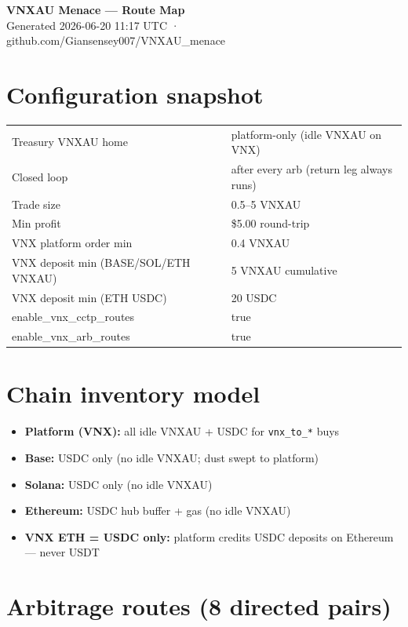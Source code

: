 \documentclass[11pt,a4paper]{article}
\begin{document}
\begin{center}
{\LARGE\bfseries\color{accent} VNXAU Menace --- Route Map}\\[6pt]
{\color{muted}\small Generated 2026-06-20 11:17 UTC · github.com/Giansensey007/VNXAU\_menace}\\[12pt]
\end{center}
\section*{Configuration snapshot}
\begin{tabular}{@{}ll@{}}
Treasury VNXAU home & platform-only (idle VNXAU on VNX) \\
Closed loop & after every arb (return leg always runs) \\
Trade size & 0.5--5 VNXAU \\
Min profit & \$5.00 round-trip \\
VNX platform order min & 0.4 VNXAU \\
VNX deposit min (BASE/SOL/ETH VNXAU) & 5 VNXAU cumulative \\
VNX deposit min (ETH USDC) & 20 USDC \\
enable\_vnx\_cctp\_routes & true \\
enable\_vnx\_arb\_routes & true \\
\end{tabular}
\section*{Chain inventory model}
\begin{itemize}[nosep]
\item \textbf{Platform (VNX):} all idle VNXAU + USDC for \texttt{vnx\_to\_*} buys
\item \textbf{Base:} USDC only (no idle VNXAU; dust swept to platform)
\item \textbf{Solana:} USDC only (no idle VNXAU)
\item \textbf{Ethereum:} USDC hub buffer + gas (no idle VNXAU)
\item \textbf{VNX ETH = USDC only:} platform credits USDC deposits on Ethereum --- never USDT
\end{itemize}
\section*{Arbitrage routes (8 directed pairs)}
\end{document}
